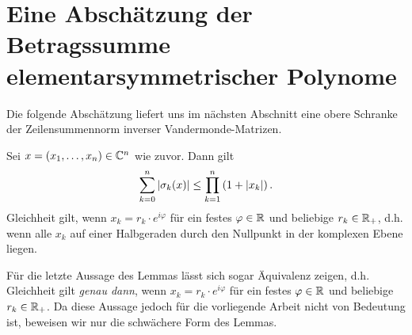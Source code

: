 \section{Eine Abschätzung der Betragssumme elementarsymmetrischer Polynome}

Die folgende Abschätzung liefert uns im nächsten Abschnitt eine obere Schranke
der Zeilensummennorm inverser Vandermonde-Matrizen.
\begin{lemma}
    \label{lemma:elementary_symmetric_polynomials_inequality}
    Sei $x = (x_1, \dots, x_n) \in \mathbb{C}^n$ wie zuvor.
    Dann gilt
    \begin{equation}
        \label{eq:elementary_symmetric_polynomials_inequality}
        \sum_{k=0}^{n} \left\lvert \sigma_{k}(x) \right\rvert \leq \prod_{k=1}^{n} \left( 1 + \left\lvert x_k \right\rvert \right).
    \end{equation}
    Gleichheit gilt, wenn $x_k = r_k \cdot e^{i\varphi}$ für ein
    festes $\varphi \in \mathbb{R}$ und beliebige $r_k \in \mathbb{R}_+$,
    d.h. wenn alle $x_k$ auf einer Halbgeraden durch den Nullpunkt
    in der komplexen Ebene liegen.
\end{lemma}

\begin{remark}
    Für die letzte Aussage des Lemmas lässt sich sogar Äquivalenz zeigen, d.h.
    Gleichheit gilt \emph{genau dann}, wenn $x_k = r_k \cdot e^{i\varphi}$ für
    ein festes $\varphi \in \mathbb{R}$ und beliebige $r_k \in \mathbb{R}_+$.
    Da diese Aussage jedoch für die vorliegende Arbeit nicht von Bedeutung ist,
    beweisen wir nur die schwächere Form des Lemmas.
\end{remark}

